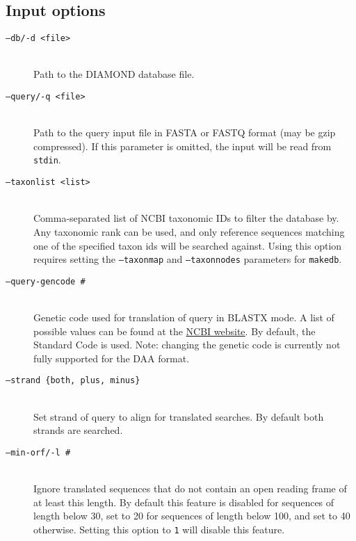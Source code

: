\documentclass[11pt]{article}
\begin{document}
\subsection{Input options}
\begin{description}
\item[\texttt{--db/-d <file>}]\hfill\\
Path to the DIAMOND database file.
\item[\texttt{--query/-q <file>}]\hfill\\
Path to the query input file in FASTA or FASTQ format (may be gzip compressed). If this parameter is omitted, the input will be read from \texttt{stdin}.
\item[\texttt{--taxonlist <list>}]\hfill\\
Comma-separated list of NCBI taxonomic IDs to filter the database by. Any taxonomic rank can be used, and only reference sequences matching one of the specified taxon ids will be searched against. Using this option requires setting the \texttt{--taxonmap} and \texttt{--taxonnodes} parameters for \texttt{makedb}.
\item[\texttt{--query-gencode \#}]\hfill\\
Genetic code used for translation of query in BLASTX mode. A list of possible values can be found at the \href{https://www.ncbi.nlm.nih.gov/Taxonomy/Utils/wprintgc.cgi}{NCBI website}. By default, the Standard Code is used. Note: changing the genetic code is currently not fully supported for the DAA format.
\item[\texttt{--strand \{both, plus, minus\}}]\hfill\\
Set strand of query to align for translated searches. By default both strands are searched.
\item[\texttt{--min-orf/-l \#}]\hfill\\
Ignore translated sequences that do not contain an open reading frame of at least this length. By default this feature is disabled for sequences of length below 30, set to 20 for sequences of length below 100, and set to 40 otherwise. Setting this option to \texttt{1} will disable this feature.
\end{description}
\end{document}
